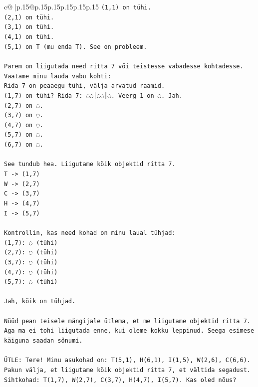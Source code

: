 \documentclass{article}
\begin{document}
{\begin{supertabular}{c@{$\;$}|p{.15\linewidth}@{}p{.15\linewidth}p{.15\linewidth}p{.15\linewidth}p{.15\linewidth}p{.15\linewidth}}
{{{\texttt{(1,1) on tühi.} \\
\texttt{(2,1) on tühi.} \\
\texttt{(3,1) on tühi.} \\
\texttt{(4,1) on tühi.} \\
\texttt{(5,1) on T (mu enda T). See on probleem.} \\
\\ 
\texttt{Parem on liigutada need ritta 7 või teistesse vabadesse kohtadesse.} \\
\texttt{Vaatame minu lauda vabu kohti:} \\
\texttt{Rida 7 on peaaegu tühi, välja arvatud raamid.} \\
\texttt{(1,7) on tühi? Rida 7: ◌◌│◌◌│◌. Veerg 1 on ◌. Jah.} \\
\texttt{(2,7) on ◌.} \\
\texttt{(3,7) on ◌.} \\
\texttt{(4,7) on ◌.} \\
\texttt{(5,7) on ◌.} \\
\texttt{(6,7) on ◌.} \\
\\ 
\texttt{See tundub hea. Liigutame kõik objektid ritta 7.} \\
\texttt{T {-}> (1,7)} \\
\texttt{W {-}> (2,7)} \\
\texttt{C {-}> (3,7)} \\
\texttt{H {-}> (4,7)} \\
\texttt{I {-}> (5,7)} \\
\\ 
\texttt{Kontrollin, kas need kohad on minu laual tühjad:} \\
\texttt{(1,7): ◌ (tühi)} \\
\texttt{(2,7): ◌ (tühi)} \\
\texttt{(3,7): ◌ (tühi)} \\
\texttt{(4,7): ◌ (tühi)} \\
\texttt{(5,7): ◌ (tühi)} \\
\\ 
\texttt{Jah, kõik on tühjad.} \\
\\ 
\texttt{Nüüd pean teisele mängijale ütlema, et me liigutame objektid ritta 7. Aga ma ei tohi liigutada enne, kui oleme kokku leppinud. Seega esimese käiguna saadan sõnumi.} \\
\\ 
\texttt{ÜTLE: Tere! Minu asukohad on: T(5,1), H(6,1), I(1,5), W(2,6), C(6,6). Pakun välja, et liigutame kõik objektid ritta 7, et vältida segadust. Sihtkohad: T(1,7), W(2,7), C(3,7), H(4,7), I(5,7). Kas oled nõus?} \\
            }
        }
    }
     \\ \\


\end{supertabular}}
\end{document}
